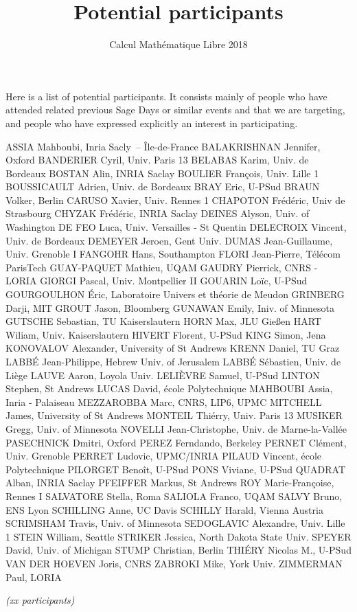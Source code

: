 \documentclass{paper}
\title{Potential participants}
\subtitle{Calcul Mathématique Libre 2018}
\date{}
\begin{document}
\maketitle
\thispagestyle{empty}

Here is a list of potential participants. It consists mainly of people
who have attended related previous Sage Days or similar events and
that we are targeting, and people who have expressed explicitly an
interest in participating.

\bigskip

\obeylines
ASSIA Mahboubi, Inria Sacly -- Île-de-France
BALAKRISHNAN Jennifer, Oxford
BANDERIER Cyril, Univ. Paris 13
BELABAS Karim, Univ. de Bordeaux
BOSTAN Alin, INRIA Saclay
BOULIER François, Univ. Lille 1
BOUSSICAULT Adrien, Univ. de Bordeaux
BRAY Eric, U-PSud
BRAUN Volker, Berlin
CARUSO Xavier, Univ. Rennes 1
CHAPOTON Frédéric, Univ de Strasbourg
CHYZAK Frédéric, INRIA Saclay
DEINES Alyson, Univ. of Washington
DE FEO Luca, Univ. Versailles - St Quentin
DELECROIX Vincent, Univ. de Bordeaux
DEMEYER Jeroen, Gent Univ.
DUMAS Jean-Guillaume, Univ. Grenoble I
FANGOHR Hans, Southampton
FLORI Jean-Pierre, Télécom ParisTech
GUAY-PAQUET Mathieu, UQAM
GAUDRY Pierrick, CNRS - LORIA
GIORGI Pascal, Univ. Montpellier II
GOUARIN Loïc, U-PSud
GOURGOULHON Éric, Laboratoire Univers et théorie de Meudon
GRINBERG Darji, MIT
GROUT Jason, Bloomberg
GUNAWAN Emily, Iniv. of Minnesota
GUTSCHE Sebastian, TU Kaiserslautern
HORN Max, JLU Gießen
HART Wiliam, Univ. Kaiserslautern
HIVERT Florent, U-PSud
KING Simon, Jena
KONOVALOV Alexander, University of St Andrews
KRENN Daniel, TU Graz
LABBÉ Jean-Philippe, Hebrew Univ. of Jerusalem
LABBÉ Sébastien, Univ. de Liège
LAUVE Aaron, Loyola Univ.
LELIÈVRE Samuel, U-PSud
LINTON Stephen, St Andrews
LUCAS David, école Polytechnique
MAHBOUBI Assia, Inria - Palaiseau
MEZZAROBBA Marc, CNRS, LIP6, UPMC
MITCHELL James, University of St Andrews
MONTEIL Thiérry, Univ. Paris 13
MUSIKER Gregg, Univ. of Minnesota
NOVELLI Jean-Christophe, Univ. de Marne-la-Vallée
PASECHNICK Dmitri, Oxford
PEREZ Ferndando, Berkeley
PERNET Clément, Univ. Grenoble
PERRET Ludovic, UPMC/INRIA
PILAUD Vincent, école Polytechnique
PILORGET Benoît, U-PSud
PONS Viviane, U-PSud
QUADRAT Alban, INRIA Saclay
PFEIFFER Markus, St Andrews
ROY Marie-Françoise, Rennes I
SALVATORE Stella, Roma
SALIOLA Franco, UQAM
SALVY Bruno, ENS Lyon
SCHILLING Anne, UC Davis
SCHILLY Harald, Vienna Austria
SCRIMSHAM Travis, Univ. of Minnesota
SEDOGLAVIC Alexandre, Univ. Lille 1
STEIN William, Seattle
STRIKER Jessica, North Dakota State Univ.
SPEYER David, Univ. of Michigan
STUMP Christian, Berlin
THIÉRY Nicolas M., U-PSud
VAN DER HOEVEN Joris, CNRS
ZABROKI Mike, York Univ.
ZIMMERMAN Paul, LORIA


\medskip
\emph{(xx participants)}
\end{document}
